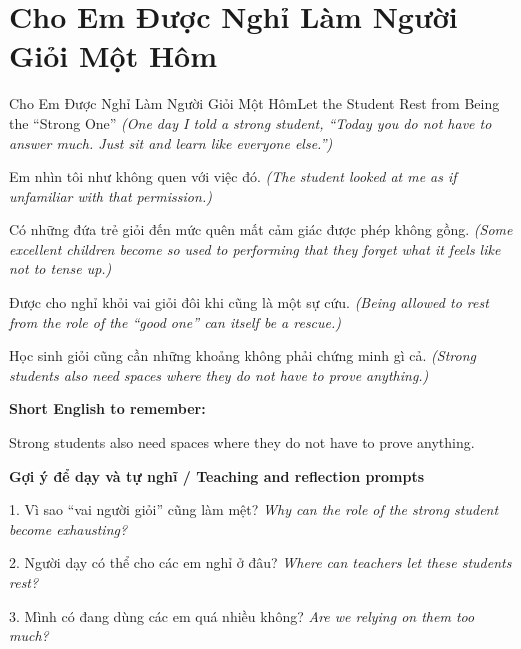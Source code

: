 \section{Cho Em Được Nghỉ Làm Người Giỏi Một Hôm}
\begin{truyen}{Cho Em Được Nghỉ Làm Người Giỏi Một Hôm}{Let the Student Rest from Being the “Strong One”}
\textit{(One day I told a strong student, “Today you do not have to answer much. Just sit and learn like everyone else.”)}

Em nhìn tôi như không quen với việc đó.
\textit{(The student looked at me as if unfamiliar with that permission.)}

Có những đứa trẻ giỏi đến mức quên mất cảm giác được phép không gồng.
\textit{(Some excellent children become so used to performing that they forget what it feels like not to tense up.)}

Được cho nghỉ khỏi vai giỏi đôi khi cũng là một sự cứu.
\textit{(Being allowed to rest from the role of the “good one” can itself be a rescue.)}

\end{truyen}

\begin{baihoc}
Học sinh giỏi cũng cần những khoảng không phải chứng minh gì cả.
\textit{(Strong students also need spaces where they do not have to prove anything.)}
\end{baihoc}

\begin{ghinhoanh}
\textbf{Short English to remember:}

Strong students also need spaces where they do not have to prove anything.

\end{ghinhoanh}

\begin{tuhocnhanh}
\textbf{Gợi ý để dạy và tự nghĩ / Teaching and reflection prompts}

1. Vì sao “vai người giỏi” cũng làm mệt? \textit{Why can the role of the strong student become exhausting?}

2. Người dạy có thể cho các em nghỉ ở đâu? \textit{Where can teachers let these students rest?}

3. Mình có đang dùng các em quá nhiều không? \textit{Are we relying on them too much?}
\end{tuhocnhanh}

